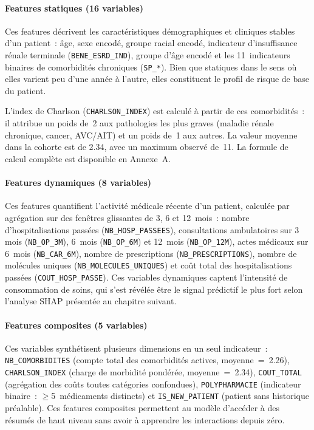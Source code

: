 \paragraph{Features statiques (16 variables)}
Ces features décrivent les caractéristiques démographiques et cliniques stables d'un
patient~: âge, sexe encodé, groupe racial encodé, indicateur d'insuffisance rénale
terminale (\texttt{BENE\_ESRD\_IND}), groupe d'âge encodé et les 11~indicateurs binaires
de comorbidités chroniques (\texttt{SP\_*}). Bien que \og statiques \fg{} dans le sens
où elles varient peu d'une année à l'autre, elles constituent le profil de risque de base
du patient.

L'index de Charlson (\texttt{CHARLSON\_INDEX}) est calculé à partir de ces comorbidités~:
il attribue un poids de~2 aux pathologies les plus graves (maladie rénale chronique, cancer,
AVC/AIT) et un poids de~1 aux autres. La valeur moyenne dans la cohorte est de 2.34, avec
un maximum observé de~11. La formule de calcul complète est disponible en Annexe~A.

\paragraph{Features dynamiques (8 variables)}
Ces features quantifient l'activité médicale récente d'un patient, calculée par agrégation
sur des fenêtres glissantes de 3, 6 et 12~mois~: nombre d'hospitalisations passées
(\texttt{NB\_HOSP\_PASSEES}), consultations ambulatoires sur 3 mois (\texttt{NB\_OP\_3M}),
6~mois (\texttt{NB\_OP\_6M}) et 12~mois (\texttt{NB\_OP\_12M}), actes médicaux sur 6~mois
(\texttt{NB\_CAR\_6M}), nombre de prescriptions (\texttt{NB\_PRESCRIPTIONS}), nombre de
molécules uniques (\texttt{NB\_MOLECULES\_UNIQUES}) et coût total des hospitalisations
passées (\texttt{COUT\_HOSP\_PASSE}). Ces variables dynamiques captent l'intensité de
consommation de soins, qui s'est révélée être le signal prédictif le plus fort selon
l'analyse SHAP présentée au chapitre suivant.

\paragraph{Features composites (5 variables)}
Ces variables synthétisent plusieurs dimensions en un seul indicateur~:
\texttt{NB\_COMORBIDITES} (compte total des comorbidités actives, moyenne~=~2.26),
\texttt{CHARLSON\_INDEX} (charge de morbidité pondérée, moyenne~=~2.34),
\texttt{COUT\_TOTAL} (agrégation des coûts toutes catégories confondues),
\texttt{POLYPHARMACIE} (indicateur binaire~: $\geq$5~médicaments distincts)
et \texttt{IS\_NEW\_PATIENT} (patient sans historique préalable). Ces features
composites permettent au modèle d'accéder à des résumés de haut niveau sans avoir à
apprendre les interactions depuis zéro.

